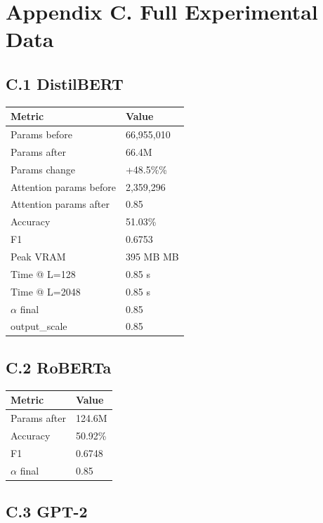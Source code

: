 \section{Appendix C. Full Experimental Data}

\subsection{C.1 DistilBERT}

\begin{table}[H]
\centering
\small
\begin{tabular}{ll}
\toprule
\textbf{Metric} & \textbf{Value} \\
\midrule
Params before & 66,955,010 \\
Params after & 66.4M \\
Params change & +48.5\%\% \\
Attention params before & 2,359,296 \\
Attention params after & 0.85 \\
Accuracy & 51.03\% \\
F1 & 0.6753 \\
Peak VRAM & 395 MB MB \\
Time @ L=128 & 0.85 s \\
Time @ L=2048 & 0.85 s \\
$\alpha$ final & 0.85 \\
output\_scale & 0.85 \\
\bottomrule
\end{tabular}
\end{table}

\subsection{C.2 RoBERTa}

\begin{table}[H]
\centering
\small
\begin{tabular}{ll}
\toprule
\textbf{Metric} & \textbf{Value} \\
\midrule
Params after & 124.6M \\
Accuracy & 50.92\% \\
F1 & 0.6748 \\
$\alpha$ final & 0.85 \\
\bottomrule
\end{tabular}
\end{table}

\subsection{C.3 GPT-2}

